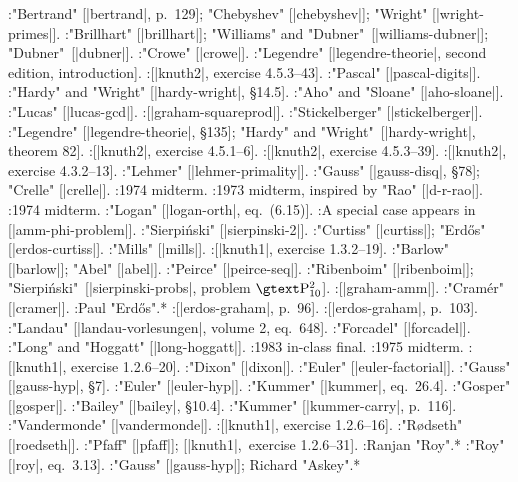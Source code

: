 :"Bertrand" [|bertrand|, p.~129]; "Chebyshev" [|chebyshev|]; "Wright" [|wright-primes|].
:"Brillhart" [|brillhart|]; "Williams" and "Dubner"~[|williams-dubner|]; "Dubner"~[|dubner|].
:"Crowe" [|crowe|].
:"Legendre" [|legendre-theorie|, second edition, introduction].
:[|knuth2|, exercise 4.5.3--43].
:"Pascal" [|pascal-digits|].
:"Hardy" and "Wright" [|hardy-wright|, \S 14.5].
:"Aho" and "Sloane" [|aho-sloane|].
:"Lucas" [|lucas-gcd|].
:[|graham-squareprod|].
:"Stickelberger" [|stickelberger|].
:"Legendre" [|legendre-theorie|, \S 135]; "Hardy" and "Wright"~[|hardy-wright|, theorem 82].
:[|knuth2|, exercise 4.5.1--6].
:[|knuth2|, exercise 4.5.3--39].
:[|knuth2|, exercise 4.3.2--13].
:"Lehmer" [|lehmer-primality|].
:"Gauss" [|gauss-disq|, \S 78]; "Crelle" [|crelle|].
:1974 midterm.
:1973 midterm, inspired by "Rao" [|d-r-rao|].
:1974 midterm.
:"Logan" [|logan-orth|, eq.~(6.15)].
:A special case appears in [|amm-phi-problem|].
:"Sierpi\'nski" [|sierpinski-2|].
:"Curtiss" [|curtiss|]; "Erd\H os" [|erdos-curtiss|].
:"Mills" [|mills|].
:[|knuth1|, exercise 1.3.2--19].
:"Barlow" [|barlow|]; "Abel" [|abel|].
:"Peirce" [|peirce-seq|].
:"Ribenboim" [|ribenboim|]; "Sierpi\'nski"~[|sierpinski-probs|, problem $\rm P_{10}^2$].
:[|graham-amm|].
:"Cram\'er" [|cramer|].
:Paul "Erd\H os".*
:[|erdos-graham|, p.~96].
:[|erdos-graham|, p.~103].
:"Landau" [|landau-vorlesungen|, volume 2, eq.~648].
:"Forcadel" [|forcadel|].
:"Long" and "Hoggatt" [|long-hoggatt|].
:1983 in-class final.
:1975 midterm.
:[|knuth1|, exercise 1.2.6--20].
:"Dixon" [|dixon|].
:"Euler" [|euler-factorial|].
:"Gauss" [|gauss-hyp|, \S 7].
:"Euler" [|euler-hyp|].
:"Kummer" [|kummer|, eq.~26.4].
:"Gosper" [|gosper|].
:"Bailey" [|bailey|, \S 10.4].
:"Kummer" [|kummer-carry|, p.~116].
:"Vandermonde" [|vandermonde|].
:[|knuth1|, exercise 1.2.6--16].
:"R\o dseth" [|roedseth|].
:"Pfaff" [|pfaff|]; [|knuth1|,~exercise 1.2.6--31].
:Ranjan "Roy".*
:"Roy" [|roy|, eq.~3.13].
:"Gauss" [|gauss-hyp|]; Richard "Askey".*
